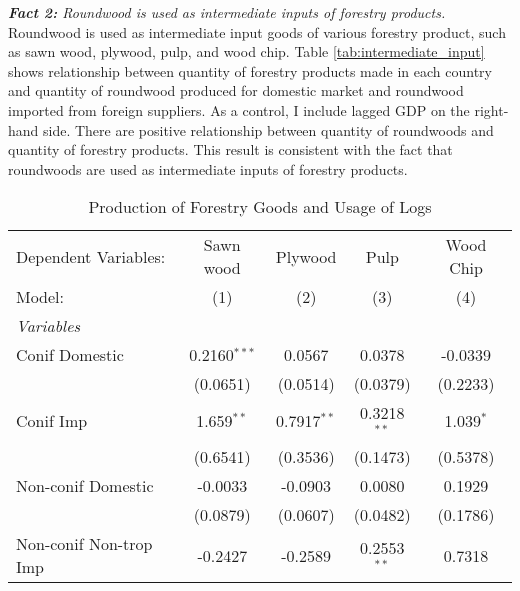 \documentclass[a4paper,12pt]{article}
\begin{document}
\textit{\textbf{Fact 2:} Roundwood is used as intermediate inputs of forestry products.} \\
Roundwood is used as intermediate input goods of various forestry product, such as sawn wood, plywood, pulp, and wood chip. Table \ref{tab:intermediate_input} shows relationship between quantity of forestry products made in each country and quantity of roundwood produced for domestic market and roundwood imported from foreign suppliers. As a control, I include lagged GDP on the right-hand side. There are positive relationship between quantity of roundwoods and quantity of forestry products. This result is consistent with the fact that roundwoods are used as intermediate inputs of forestry products.

\begin{table}[htbp]
    \caption{Production of Forestry Goods and Usage of Logs}
    \centering
    \begin{tabular}{lcccc}
       \tabularnewline \midrule \midrule
       Dependent Variables:     & Sawn wood                    & Plywood                     & Pulp                    & Wood Chip\\  
       Model:                   & (1)                     & (2)                         & (3)                     & (4)\\  
       \midrule
       \emph{Variables}\\
       Conif Domestic          & 0.2160$^{***}$          & 0.0567                      & 0.0378                  & -0.0339\\   
                                & (0.0651)                & (0.0514)                    & (0.0379)                & (0.2233)\\   
       Conif Imp               & 1.659$^{**}$            & 0.7917$^{**}$               & 0.3218$^{**}$           & 1.039$^{*}$\\   
                                & (0.6541)                & (0.3536)                    & (0.1473)                & (0.5378)\\   
       Non-conif Domestic       & -0.0033                 & -0.0903                     & 0.0080                  & 0.1929\\   
                                & (0.0879)                & (0.0607)                    & (0.0482)                & (0.1786)\\   
     Non-conif Non-trop Imp   & -0.2427                 & -0.2589                     & 0.2553$^{**}$           & 0.7318\\   

\end{tabular}
\end{table}
\end{document}
